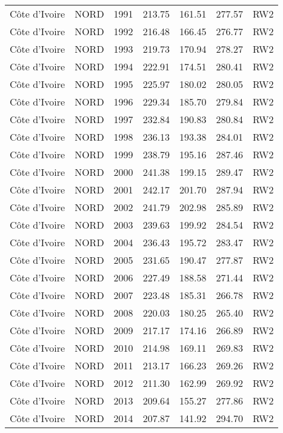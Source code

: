 \begin{longtable}{lllrrrl}
  C\^{o}te d'Ivoire & NORD & 1991 & 213.75 & 161.51 & 277.57 & RW2 \\ 
  C\^{o}te d'Ivoire & NORD & 1992 & 216.48 & 166.45 & 276.77 & RW2 \\ 
  C\^{o}te d'Ivoire & NORD & 1993 & 219.73 & 170.94 & 278.27 & RW2 \\ 
  C\^{o}te d'Ivoire & NORD & 1994 & 222.91 & 174.51 & 280.41 & RW2 \\ 
  C\^{o}te d'Ivoire & NORD & 1995 & 225.97 & 180.02 & 280.05 & RW2 \\ 
  C\^{o}te d'Ivoire & NORD & 1996 & 229.34 & 185.70 & 279.84 & RW2 \\ 
  C\^{o}te d'Ivoire & NORD & 1997 & 232.84 & 190.83 & 280.84 & RW2 \\ 
  C\^{o}te d'Ivoire & NORD & 1998 & 236.13 & 193.38 & 284.01 & RW2 \\ 
  C\^{o}te d'Ivoire & NORD & 1999 & 238.79 & 195.16 & 287.46 & RW2 \\ 
  C\^{o}te d'Ivoire & NORD & 2000 & 241.38 & 199.15 & 289.47 & RW2 \\ 
  C\^{o}te d'Ivoire & NORD & 2001 & 242.17 & 201.70 & 287.94 & RW2 \\ 
  C\^{o}te d'Ivoire & NORD & 2002 & 241.79 & 202.98 & 285.89 & RW2 \\ 
  C\^{o}te d'Ivoire & NORD & 2003 & 239.63 & 199.92 & 284.54 & RW2 \\ 
  C\^{o}te d'Ivoire & NORD & 2004 & 236.43 & 195.72 & 283.47 & RW2 \\ 
  C\^{o}te d'Ivoire & NORD & 2005 & 231.65 & 190.47 & 277.87 & RW2 \\ 
  C\^{o}te d'Ivoire & NORD & 2006 & 227.49 & 188.58 & 271.44 & RW2 \\ 
  C\^{o}te d'Ivoire & NORD & 2007 & 223.48 & 185.31 & 266.78 & RW2 \\ 
  C\^{o}te d'Ivoire & NORD & 2008 & 220.03 & 180.25 & 265.40 & RW2 \\ 
  C\^{o}te d'Ivoire & NORD & 2009 & 217.17 & 174.16 & 266.89 & RW2 \\ 
  C\^{o}te d'Ivoire & NORD & 2010 & 214.98 & 169.11 & 269.83 & RW2 \\ 
  C\^{o}te d'Ivoire & NORD & 2011 & 213.17 & 166.23 & 269.26 & RW2 \\ 
  C\^{o}te d'Ivoire & NORD & 2012 & 211.30 & 162.99 & 269.92 & RW2 \\ 
  C\^{o}te d'Ivoire & NORD & 2013 & 209.64 & 155.27 & 277.86 & RW2 \\ 
  C\^{o}te d'Ivoire & NORD & 2014 & 207.87 & 141.92 & 294.70 & RW2 \\ 

\end{longtable}
